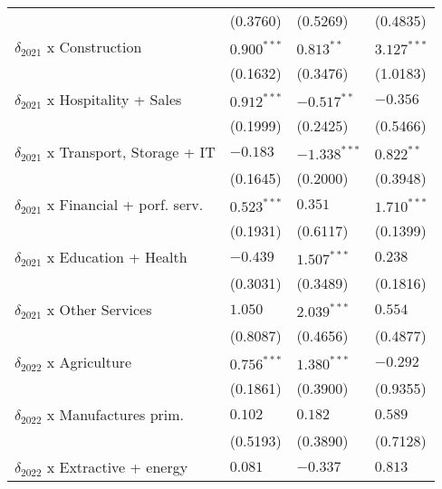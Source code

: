 \begin{tabular}{llll}
                                                   &        (0.3760) &        (0.5269) &        (0.4835) \\
$\delta_{2021}$ x Construction                     &   $0.900^{***}$ &    $0.813^{**}$ &   $3.127^{***}$ \\
                                                   &        (0.1632) &        (0.3476) &        (1.0183) \\
$\delta_{2021}$ x Hospitality + Sales              &   $0.912^{***}$ &   $-0.517^{**}$ &        $-0.356$ \\
                                                   &        (0.1999) &        (0.2425) &        (0.5466) \\
$\delta_{2021}$ x Transport, Storage + IT          &        $-0.183$ &  $-1.338^{***}$ &    $0.822^{**}$ \\
                                                   &        (0.1645) &        (0.2000) &        (0.3948) \\
$\delta_{2021}$ x Financial + porf. serv.          &   $0.523^{***}$ &         $0.351$ &   $1.710^{***}$ \\
                                                   &        (0.1931) &        (0.6117) &        (0.1399) \\
$\delta_{2021}$ x Education + Health               &        $-0.439$ &   $1.507^{***}$ &         $0.238$ \\
                                                   &        (0.3031) &        (0.3489) &        (0.1816) \\
$\delta_{2021}$ x Other Services                   &         $1.050$ &   $2.039^{***}$ &         $0.554$ \\
                                                   &        (0.8087) &        (0.4656) &        (0.4877) \\
$\delta_{2022}$ x Agriculture                      &   $0.756^{***}$ &   $1.380^{***}$ &        $-0.292$ \\
                                                   &        (0.1861) &        (0.3900) &        (0.9355) \\
$\delta_{2022}$ x Manufactures prim.               &         $0.102$ &         $0.182$ &         $0.589$ \\
                                                   &        (0.5193) &        (0.3890) &        (0.7128) \\
$\delta_{2022}$ x Extractive + energy              &         $0.081$ &        $-0.337$ &         $0.813$ \\

\end{tabular}
